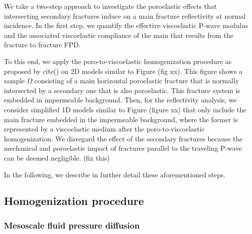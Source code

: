 \documentclass[draft]{agujournal2019}
\begin{document}
We take a two-step approach
to investigate the poroelastic effects that intersecting secondary fractures induce on a main  fracture reflectivity at normal incidence. In the first step, we quantify the effective viscoelastic P-wave modulus and the associated viscoelastic compliance of the main that results from the fracture to fracture FPD.

 To this end, we apply the  poro-to-viscoelastic homogenization procedure as proposed by cite() on 2D models similar to Figure (fig xx). This figure shows a sample $\Omega$ consisting of a main horizontal poroelastic fracture that is normally intersected by a secondary one that is also poroelastic. This fracture system is embedded in impermeable background. Then, for the reflectivity analysis, we consider simplified 1D models similar to Figure (figure xx) that only include the main fracture embedded in the  impermeable background, where the former is represented by a viscoelastic medium after the poro-to-viscoelastic homogenization. We disregard the effect of the secondary fractures because the mechanical and poroelastic impact of fractures parallel to the traveling P-wave can be deemed negligible. (fix this)

In the following, we describe in further detail these aforementioned steps.


\subsection{Homogenization procedure}

\subsubsection{Mesoscale fluid pressure diffusion}
\end{document}
